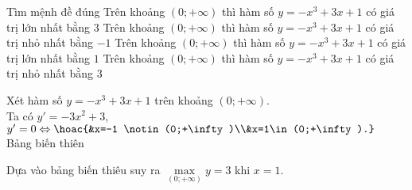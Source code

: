 \begin{ex}%
    Tìm mệnh đề đúng
    \choice
    {\True Trên khoảng $(0; +\infty)$ thì hàm số $y=-x^3+3x+1$ có giá trị lớn nhất bằng $3$}
    {Trên khoảng $(0; +\infty)$ thì hàm số $y=-x^3+3x+1$ có giá trị nhỏ nhất bằng $-1$}
    {Trên khoảng $(0; +\infty)$ thì hàm số $y=-x^3+3x+1$ có giá trị lớn nhất bằng $1$}
    {Trên khoảng $(0; +\infty)$ thì hàm số $y=-x^3+3x+1$ có giá trị nhỏ nhất bằng $3$}
    \loigiai
    {Xét hàm số $y=-x^3+3x+1$ trên khoảng $(0;+\infty)$.\\
        Ta có $y'=-3x^2+3$, $y'=0\Leftrightarrow \hoac{&x=-1 \notin (0;+\infty)\\&x=1\in (0;+\infty).}$\\
        Bảng biến thiên
        \begin{center}
        \end{center}
        Dựa vào bảng biến thiêu suy ra $\max\limits_{(0;+\infty)}y=3$ khi $x=1$.}
\end{ex}

